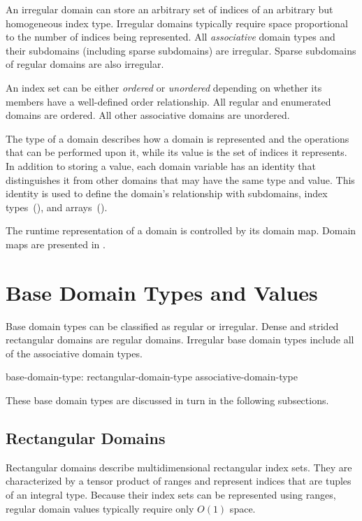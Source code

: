 An irregular domain can store an arbitrary set of indices of an arbitrary but
homogeneous index type.  Irregular domains typically require space proportional
to the number of indices being represented.  All \emph{associative} domain types
and their subdomains (including sparse subdomains) are irregular.  Sparse
subdomains of regular domains are also irregular.

An index set can be either \emph{ordered} or \emph{unordered} depending on
whether its members have a well-defined order relationship.  All regular and
enumerated domains are ordered.  All other associative domains are
unordered.

The type of a domain describes how a domain is represented and the operations
that can be performed upon it, while its value is the set of indices it represents.
In addition to storing a value, each domain variable has an identity that
distinguishes it from other domains that may have the same type and
value.  This identity is used to define the domain's relationship
with subdomains, index types~(),
and arrays~().

The runtime representation of a domain is controlled by its domain map.
Domain maps are presented in .


\section{Base Domain Types and Values}
\label{Base_Domain_Types_and_Values}

Base domain types can be classified as regular or irregular.  Dense and
strided rectangular domains are regular domains.
Irregular base domain types include all of the associative domain types.

\begin{syntax}
base-domain-type:
  rectangular-domain-type
  associative-domain-type
\end{syntax}

These base domain types are discussed in turn in the following
subsections.

\subsection{Rectangular Domains}

Rectangular domains describe multidimensional rectangular index sets.  They are
characterized by a tensor product of ranges and represent indices that are
tuples of an integral type.  Because their index sets can be represented using
ranges, regular domain values typically require only $O(1)$ space.

